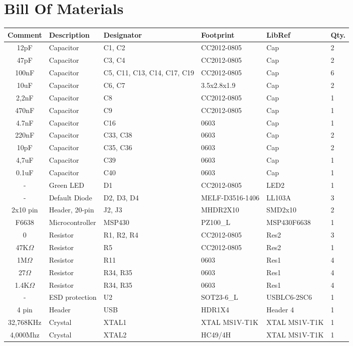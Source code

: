 \section{Bill Of Materials}
{\footnotesize
\begin{tabular}{| c |l | p{1.5cm} | l | l | l |} 
	\hline
		Comment & Description & Designator & Footprint & LibRef & Qty.\\ \hline
		12pF & Capacitor & C1, C2 & CC2012-0805 & Cap & 2\\ \hline
		47pF & Capacitor & C3, C4 & CC2012-0805 & Cap & 2\\ \hline
		100nF & Capacitor & C5, C11, C13, C14, C17, C19 & CC2012-0805 & Cap & 6\\ \hline
		10uF & Capacitor & C6, C7 & 3.5x2.8x1.9 & Cap & 2\\ \hline
		2,2nF & Capacitor & C8 & CC2012-0805 & Cap & 1\\ \hline
		470nF & Capacitor & C9 & CC2012-0805 & Cap & 1\\ \hline
		4.7nF & Capacitor & C16 & 0603 & Cap & 1\\ \hline
		220nF & Capacitor & C33, C38 & 0603 & Cap & 2\\ \hline
		10pF & Capacitor & C35, C36 & 0603 & Cap & 2\\ \hline
		4,7uF & Capacitor & C39 & 0603 & Cap & 1\\ \hline
		0.1uF & Capacitor & C40 & 0603 & Cap & 1\\ \hline
		- & Green LED & D1 & CC2012-0805 & LED2 & 1\\ \hline
		- & Default Diode & D2, D3, D4 & MELF-D3516-1406 &  LL103A & 3\\ \hline
		2x10 pin & Header, 20-pin & J2, J3 & MHDR2X10 & SMD2x10 & 2\\ \hline
		F6638 & Microcontroller & MSP430 & PZ100\_L & MSP430F6638 & 1\\ \hline
		0 & Resistor & R1, R2, R4 & CC2012-0805 & Res2 & 3\\ \hline
		47K$\Omega$ & Resistor & R5 & CC2012-0805 & Res2 & 1\\ \hline
		1M$\Omega$ & Resistor & R11 & 0603 & Res1 & 4\\ \hline
		27$\Omega$ & Resistor & R34, R35 & 0603 & Res1 & 4\\ \hline
		1.4K$\Omega$ & Resistor & R34, R35 & 0603 & Res1 & 4\\ \hline
		- & ESD protection & U2 & SOT23-6\_L & USBLC6-2SC6 & 1\\ \hline
		4 pin & Header & USB & HDR1X4 & Header 4 & 1\\ \hline
		32,768KHz & Crystal & XTAL1 & XTAL MS1V-T1K & XTAL MS1V-T1K & 1\\ \hline
		4,000Mhz & Crystal	& XTAL2 & HC49/4H & XTAL MS1V-T1K & 1\\ \hline
\end{tabular}\\\\
}

